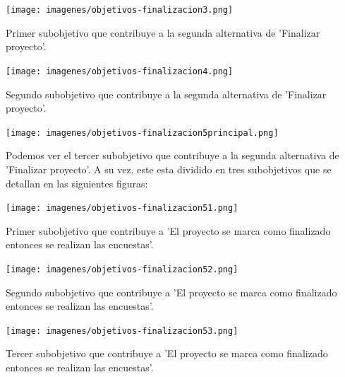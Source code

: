 \texttt{[image: imagenes/objetivos-finalizacion3.png]}

Primer subobjetivo que contribuye a la segunda alternativa de 'Finalizar proyecto'.

\texttt{[image: imagenes/objetivos-finalizacion4.png]}

Segundo subobjetivo que contribuye a la segunda alternativa de 'Finalizar proyecto'.

\texttt{[image: imagenes/objetivos-finalizacion5principal.png]}

Podemos ver el tercer subobjetivo que contribuye a la segunda alternativa de 'Finalizar proyecto'. A su vez, este esta dividido en tres subobjetivos que se detallan en las siguientes figuras:

\texttt{[image: imagenes/objetivos-finalizacion51.png]}

Primer subobjetivo que contribuye a 'El proyecto se marca como finalizado entonces se realizan las encuestas'.

\texttt{[image: imagenes/objetivos-finalizacion52.png]}

Segundo subobjetivo que contribuye a 'El proyecto se marca como finalizado entonces se realizan las encuestas'.

\texttt{[image: imagenes/objetivos-finalizacion53.png]}

Tercer subobjetivo que contribuye a 'El proyecto se marca como finalizado entonces se realizan las encuestas'.
